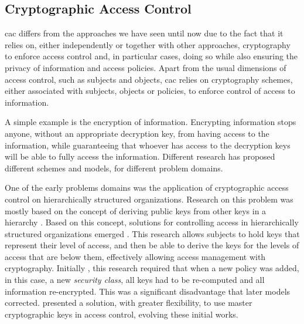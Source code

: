 \subsection{Cryptographic Access Control}

\gls{cac} differs from the approaches we have seen until now due to the fact that it relies on, either independently or together with other approaches, cryptography to enforce access control and, in particular cases, doing so while also ensuring the privacy of information and access policies. Apart from the usual dimensions of access control, such as subjects and objects, \gls{cac} relies on cryptography schemes, either associated with subjects, objects or policies, to enforce control of access to information.

A simple example is the encryption of information. Encrypting information stops anyone, without an appropriate decryption key, from having access to the information, while guaranteeing that whoever has access to the decryption keys will be able to fully access the information. Different research has proposed different schemes and models, for different problem domains.

One of the early problems domains was the application of cryptographic access control on hierarchically structured organizations. Research on this problem was mostly based on the concept of deriving public keys from other keys in a hierarchy \cite{denning_master_1981}. Based on this concept, solutions for controlling access in hierarchically structured organizations emerged \cite{akl_cryptographic_1983, sandhu_cryptographic_1988}. This research allows subjects to hold keys that represent their level of access, and then be able to derive the keys for the levels of access that are below them, effectively allowing access management with cryptography. Initially \cite{akl_cryptographic_1983}, this research required that when a new policy was added, in this case, a new \emph{security class}, all keys had to be re-computed and all information re-encrypted. This was a significant disadvantage that later models \cite{sandhu_cryptographic_1988} corrected. \citeauthor{brassard_flexible_1990} \cite{brassard_flexible_1990} presented a solution, with greater flexibility, to use master cryptographic keys in access control, evolving these initial works.

